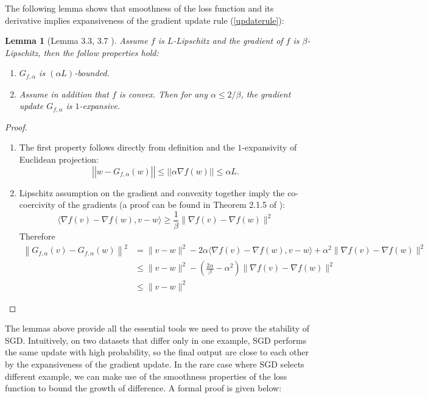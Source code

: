 \documentclass{article}[12pt]
\newtheorem{lemma}{Lemma}
\newcommand{\norm}[1]{\left|\left|#1\right|\right|}
\begin{document}
The following lemma shows that smoothness of the loss function and its derivative implies expansiveness of the gradient update rule (\ref{updaterule}):
\begin{lemma} [Lemma 3.3, 3.7 \cite{trainfaster}] \label{expansive}
  Assume $f$ is $L$-Lipschitz and the gradient of $f$ is $\beta$-Lipschitz, then the follow properties hold:
  \begin{enumerate}
   \item $G_{f, \alpha}$ is $(\alpha L)$-bounded.
   \item Assume in addition that $f$ is convex. Then for any $\alpha \leq 2/\beta$, the gradient update $G_{f, \alpha}$ is $1$-expansive.
  \end{enumerate} 
\end{lemma}
\begin{proof}
   \begin{enumerate}
      \item The first property follows directly from definition and the $1$-expansivity of Euclidean projection:
      \[
      \norm{w - G_{f, \alpha}(w)} \leq \norm{\alpha \nabla f(w)} \leq \alpha L.
      \] 
      \item 
      Lipschitz assumption on the gradient and convexity together imply the co-coercivity of the gradients (a proof can be found in Theorem 2.1.5 of \cite{Nesterov2018}):
      \[
         \langle\nabla f(v)-\nabla f(w), v-w\rangle \geq \frac{1}{\beta}\|\nabla f(v)-\nabla f(w)\|^{2}   
      \]
      Therefore 
      \[
      \begin{aligned}\left\|G_{f, \alpha}(v)-G_{f, \alpha}(w)\right\|^{2} &=\|v-w\|^{2}-2 \alpha\langle\nabla f(v)-\nabla f(w), v-w\rangle+\alpha^{2}\|\nabla f(v)-\nabla f(w)\|^{2} \\ & \leq\|v-w\|^{2}-\left(\frac{2 \alpha}{\beta}-\alpha^{2}\right)\|\nabla f(v)-\nabla f(w)\|^{2} \\ & \leq\|v-w\|^{2} \end{aligned}
      \]
   \end{enumerate}
\end{proof}
The lemmas above provide all the essential tools we need to prove the stability of SGD. Intuitively, on two datasets that differ only in one example, SGD performs the same update with high probability, so the final output are close to each other by the expansiveness of the gradient update. In the rare case where SGD selects different example, we can make use of the smoothness properties of the loss function to bound the growth of difference. A formal proof is given below:
\end{document}

